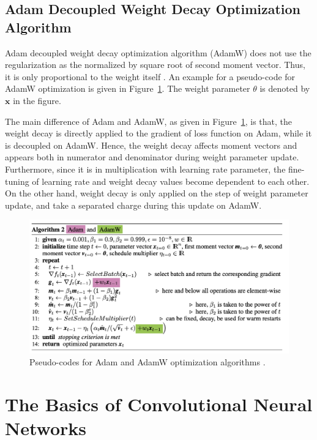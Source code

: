 \subsection{Adam Decoupled Weight Decay Optimization Algorithm}

Adam decoupled weight decay optimization algorithm (AdamW) does not use the regularization as the normalized by square root of second moment vector. Thus, it is only proportional to the weight itself \cite{Adam}. An example for a pseudo-code for AdamW optimization is given in Figure~\ref{fig:adam_and_adamw}. The weight parameter $\theta$ is denoted by $\textbf{x}$ in the figure.

The main difference of Adam and AdamW, as given in Figure~\ref{fig:adam_and_adamw}, is that, the weight decay is directly applied to the gradient of loss function on Adam, while it is decoupled on AdamW. Hence, the weight decay affects moment vectors and appears both in numerator and denominator during weight parameter update. Furthermore, since it is in multiplication with learning rate parameter, the fine-tuning of learning rate and weight decay values become dependent to each other. On the other hand, weight decay is only applied on the step of weight parameter update, and take a separated charge during this update on AdamW.

\begin{figure}[h]
	\centering
	\includegraphics[width=\linewidth]{fig/adam_n_adamw.png}
	\vspace*{1mm}
	\caption{Pseudo-codes for Adam and AdamW optimization algorithms \cite{weight_decay_regularization}.}
	\label{fig:adam_and_adamw}
\end{figure}

\section{The Basics of Convolutional Neural Networks} 
\label{sec:basics_of_cnn}

